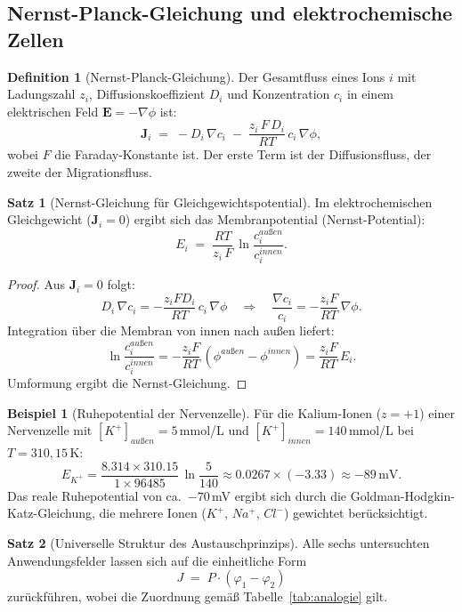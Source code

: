 ﻿\documentclass[a4paper,12pt]{article}
\theoremstyle{definition}
\newtheorem{definition}{Definition}
\newtheorem{beispiel}{Beispiel}
\newtheorem{satz}{Satz}
\begin{document}
\subsection{Nernst-Planck-Gleichung und elektrochemische Zellen}

\begin{definition}[Nernst-Planck-Gleichung]
    Der Gesamtfluss eines Ions $i$ mit Ladungszahl $z_i$, Diffusionskoeffizient $D_i$
    und Konzentration $c_i$ in einem elektrischen Feld $\mathbf{E} = -\nabla\phi$ ist:
    \[
        \mathbf{J}_i \;=\; -D_i\,\nabla c_i
        \;-\; \frac{z_i\,F\,D_i}{RT}\,c_i\,\nabla\phi,
    \]
    wobei $F$ die Faraday-Konstante ist. Der erste Term ist der Diffusionsfluss,
    der zweite der Migrationsfluss.
\end{definition}

\begin{satz}[Nernst-Gleichung für Gleichgewichtspotential]
    Im elektrochemischen Gleichgewicht ($\mathbf{J}_i = 0$) ergibt sich das
    Membranpotential (Nernst-Potential):
    \[
        E_i \;=\; \frac{RT}{z_i\,F}\,\ln\frac{c_i^{außen}}{c_i^{innen}}.
    \]
\end{satz}

\begin{proof}
    Aus $\mathbf{J}_i = 0$ folgt:
    \[
        D_i\,\nabla c_i = -\frac{z_i F D_i}{RT}\,c_i\,\nabla\phi
        \quad\Rightarrow\quad
        \frac{\nabla c_i}{c_i} = -\frac{z_i F}{RT}\,\nabla\phi.
    \]
    Integration über die Membran von innen nach außen liefert:
    \[
        \ln\frac{c_i^{außen}}{c_i^{innen}} = -\frac{z_i F}{RT}\,(\phi^{außen} - \phi^{innen})
        = \frac{z_i F}{RT}\,E_i.
    \]
    Umformung ergibt die Nernst-Gleichung. \qedhere
\end{proof}

\begin{beispiel}[Ruhepotential der Nervenzelle]
    Für die Kalium-Ionen ($z = +1$) einer Nervenzelle mit
    $[K^+]_{außen} = 5$\,mmol/L und $[K^+]_{innen} = 140$\,mmol/L
    bei $T = 310{,}15$\,K:
    \[
        E_{K^+} = \frac{8.314 \times 310.15}{1 \times 96485}\,
        \ln\frac{5}{140}
        \approx 0.0267 \times (-3.33)
        \approx -89\,\mathrm{mV}.
    \]
    Das reale Ruhepotential von ca.\ $-70$\,mV ergibt sich durch die
    Goldman-Hodgkin-Katz-Gleichung, die mehrere Ionen ($K^+$, $Na^+$, $Cl^-$)
    gewichtet berücksichtigt.
\end{beispiel}

\begin{satz}[Universelle Struktur des Austauschprinzips]
    Alle sechs untersuchten Anwendungsfelder lassen sich auf die einheitliche Form
    \[
        J \;=\; P \cdot (\varphi_1 - \varphi_2)
    \]
    zurückführen, wobei die Zuordnung gemäß Tabelle~\ref{tab:analogie} gilt.
\end{satz}
\end{document}
